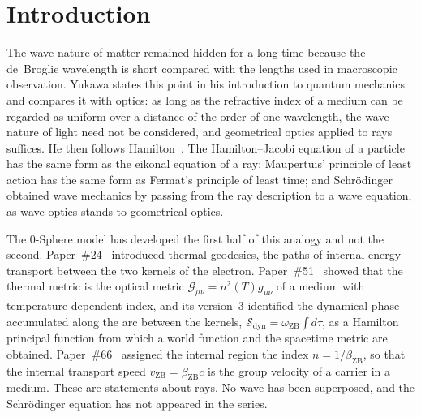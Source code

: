 \documentclass[%
 reprint, amsmath,amssymb, aps, prb, ]{revtex4-2}
\numberwithin{equation}{section}
\newcommand{\omZB}{\omega_{\text{ZB}}}
\newcommand{\bZB}{\beta_{\mathrm{ZB}}}
\newcommand{\Sdyn}{\mathcal{S}_{\mathrm{dyn}}}
\begin{document}
\begin{abstract}
Because the internal phase advances uniformly, the quartic energy contains only the harmonics $0$, $\nu_{\mathrm{ZB}}$ and $2\nu_{\mathrm{ZB}}$ ($41.36$~keV); written as the density of a product of two amplitudes, it shows that unequal rates of the two factors would split the first line and add sum and beat lines. The internal transfer may not oscillate the charge dipole, and an electron of kinetic energy $419$~eV carries the momentum of a $20.7$~keV photon.
\end{abstract}

\maketitle

\section{Introduction}
\label{sec:intro}

The wave nature of matter remained hidden for a long time because the de~Broglie wavelength is short compared with the lengths used in macroscopic observation. Yukawa states this point in his introduction to quantum mechanics~\cite{Yukawa1954} and compares it with optics: as long as the refractive index of a medium can be regarded as uniform over a distance of the order of one wavelength, the wave nature of light need not be considered, and geometrical optics applied to rays suffices. He then follows Hamilton~\cite{Hamilton1834}. The Hamilton--Jacobi equation of a particle has the same form as the eikonal equation of a ray; Maupertuis' principle of least action has the same form as Fermat's principle of least time; and Schr\"odinger~\cite{Schrodinger1926} obtained wave mechanics by passing from the ray description to a wave equation, as wave optics stands to geometrical optics.

The 0-Sphere model has developed the first half of this analogy and not the second. Paper~\#24~\cite{H24} introduced thermal geodesics, the paths of internal energy transport between the two kernels of the electron. Paper~\#51~\cite{H51} showed that the thermal metric is the optical metric $\mathcal{G}_{\mu\nu} = n^2(T)g_{\mu\nu}$ of a medium with temperature-dependent index, and its version~3 identified the dynamical phase accumulated along the arc between the kernels, $\Sdyn = \omZB\int d\tau$, as a Hamilton principal function from which a world function and the spacetime metric are obtained. Paper~\#66~\cite{H66} assigned the internal region the index $n = 1/\bZB$, so that the internal transport speed $v_{\mathrm{ZB}} = \bZB c$ is the group velocity of a carrier in a medium. These are statements about rays. No wave has been superposed, and the Schr\"odinger equation has not appeared in the series.
\end{document}
